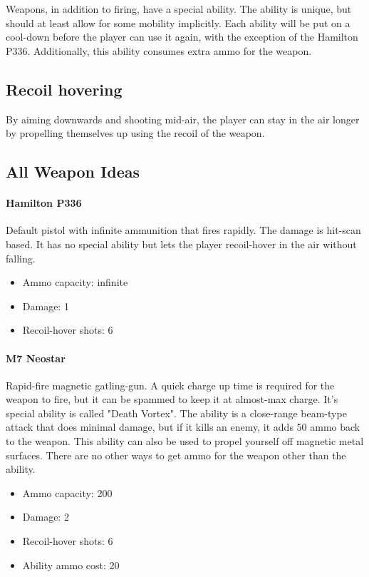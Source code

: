 \documentclass[12pt]{article}
\begin{document}
Weapons, in addition to firing, have a special ability. The ability is unique, but should at least allow for some mobility implicitly. Each ability will be put on a cool-down before the player can use it again, with the exception of the Hamilton P336. Additionally, this ability consumes extra ammo for the weapon.

\subsection{Recoil hovering}

By aiming downwards and shooting mid-air, the player can stay in the air longer by propelling themselves up using the recoil of the weapon. 

\subsection{All Weapon Ideas}

\paragraph{Hamilton P336} 

Default pistol with infinite ammunition that fires rapidly. The damage is hit-scan based. It has no special ability but lets the player recoil-hover in the air without falling.

\begin{itemize}
	\item Ammo capacity: infinite
	\item Damage: 1
	\item Recoil-hover shots: 6
\end{itemize}

\paragraph{M7 Neostar}

Rapid-fire magnetic gatling-gun. A quick charge up time is required for the weapon to fire, but it can be spammed to keep it at almost-max charge. It's special ability is called "Death Vortex". The ability is a close-range beam-type attack that does minimal damage, but if it kills an enemy, it adds 50 ammo back to the weapon. This ability can also be used to propel yourself off magnetic metal surfaces. There are no other ways to get ammo for the weapon other than the ability.

\begin{itemize}
	\item Ammo capacity: 200
	\item Damage: 2
	\item Recoil-hover shots: 6
	\item Ability ammo cost: 20
\end{itemize}
\end{document}
